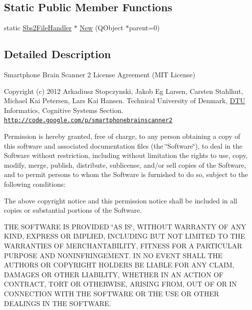\subsection*{Static Public Member Functions}
\begin{DoxyCompactItemize}
\item 
static \hyperlink{classSbs2FileHandler}{Sbs2\-File\-Handler} $\ast$ \hyperlink{classSbs2FileHandler_a3f219d55c277ff005a90cdf92ce0411b}{New} (Q\-Object $\ast$parent=0)
\end{DoxyCompactItemize}


\subsection{Detailed Description}
Smartphone Brain Scanner 2 License Agreement (M\-I\-T License)

Copyright (c) 2012 Arkadiusz Stopczynski, Jakob Eg Larsen, Carsten Stahlhut, Michael Kai Petersen, Lars Kai Hansen. Technical University of Denmark, \hyperlink{namespaceDTU}{D\-T\-U} Informatics, Cognitive Systems Section. \href{http://code.google.com/p/smartphonebrainscanner2}{\tt http\-://code.\-google.\-com/p/smartphonebrainscanner2}

Permission is hereby granted, free of charge, to any person obtaining a copy of this software and associated documentation files (the \char`\"{}\-Software\char`\"{}), to deal in the Software without restriction, including without limitation the rights to use, copy, modify, merge, publish, distribute, sublicense, and/or sell copies of the Software, and to permit persons to whom the Software is furnished to do so, subject to the following conditions\-:

The above copyright notice and this permission notice shall be included in all copies or substantial portions of the Software.

T\-H\-E S\-O\-F\-T\-W\-A\-R\-E I\-S P\-R\-O\-V\-I\-D\-E\-D \char`\"{}\-A\-S I\-S\char`\"{}, W\-I\-T\-H\-O\-U\-T W\-A\-R\-R\-A\-N\-T\-Y O\-F A\-N\-Y K\-I\-N\-D, E\-X\-P\-R\-E\-S\-S O\-R I\-M\-P\-L\-I\-E\-D, I\-N\-C\-L\-U\-D\-I\-N\-G B\-U\-T N\-O\-T L\-I\-M\-I\-T\-E\-D T\-O T\-H\-E W\-A\-R\-R\-A\-N\-T\-I\-E\-S O\-F M\-E\-R\-C\-H\-A\-N\-T\-A\-B\-I\-L\-I\-T\-Y, F\-I\-T\-N\-E\-S\-S F\-O\-R A P\-A\-R\-T\-I\-C\-U\-L\-A\-R P\-U\-R\-P\-O\-S\-E A\-N\-D N\-O\-N\-I\-N\-F\-R\-I\-N\-G\-E\-M\-E\-N\-T. I\-N N\-O E\-V\-E\-N\-T S\-H\-A\-L\-L T\-H\-E A\-U\-T\-H\-O\-R\-S O\-R C\-O\-P\-Y\-R\-I\-G\-H\-T H\-O\-L\-D\-E\-R\-S B\-E L\-I\-A\-B\-L\-E F\-O\-R A\-N\-Y C\-L\-A\-I\-M, D\-A\-M\-A\-G\-E\-S O\-R O\-T\-H\-E\-R L\-I\-A\-B\-I\-L\-I\-T\-Y, W\-H\-E\-T\-H\-E\-R I\-N A\-N A\-C\-T\-I\-O\-N O\-F C\-O\-N\-T\-R\-A\-C\-T, T\-O\-R\-T O\-R O\-T\-H\-E\-R\-W\-I\-S\-E, A\-R\-I\-S\-I\-N\-G F\-R\-O\-M, O\-U\-T O\-F O\-R I\-N C\-O\-N\-N\-E\-C\-T\-I\-O\-N W\-I\-T\-H T\-H\-E S\-O\-F\-T\-W\-A\-R\-E O\-R T\-H\-E U\-S\-E O\-R O\-T\-H\-E\-R D\-E\-A\-L\-I\-N\-G\-S I\-N T\-H\-E S\-O\-F\-T\-W\-A\-R\-E. 

